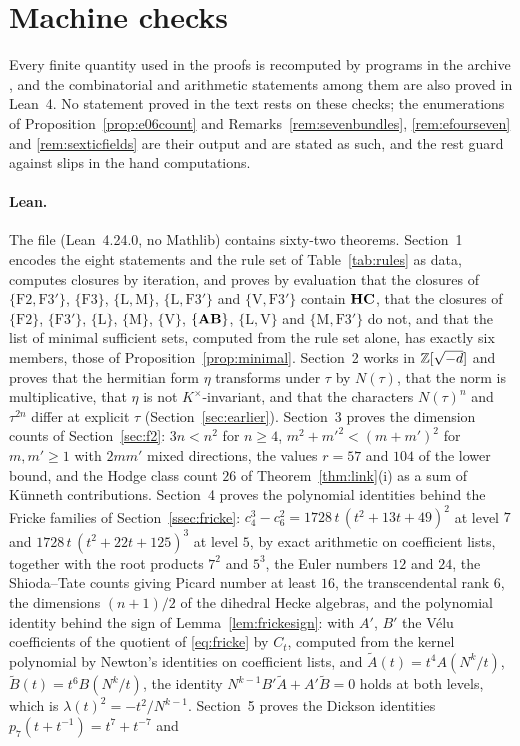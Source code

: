 \section{Machine checks}\label{app:checks}

Every finite quantity used in the proofs is recomputed by programs in the archive \cite{BB26code}, and the combinatorial and arithmetic statements among them are also proved in Lean~4. No statement proved in the text rests on these checks; the enumerations of Proposition~\ref{prop:e06count} and Remarks~\ref{rem:sevenbundles}, \ref{rem:efourseven} and \ref{rem:sexticfields} are their output and are stated as such, and the rest guard against slips in the hand computations.

\paragraph{Lean.} The file  (Lean~4.24.0, no Mathlib) contains sixty-two theorems. Section~1 encodes the eight statements and the rule set of Table~\ref{tab:rules} as data, computes closures by iteration, and proves by evaluation that the closures of $\{\mathrm{F2},\mathrm{F3}'\}$, $\{\mathrm{F3}\}$, $\{\mathrm{L},\mathrm{M}\}$, $\{\mathrm{L},\mathrm{F3}'\}$ and $\{\mathrm{V},\mathrm{F3}'\}$ contain $\mathbf{HC}$, that the closures of $\{\mathrm{F2}\}$, $\{\mathrm{F3}'\}$, $\{\mathrm{L}\}$, $\{\mathrm{M}\}$, $\{\mathrm{V}\}$, $\{\mathbf{AB}\}$, $\{\mathrm{L},\mathrm{V}\}$ and $\{\mathrm{M},\mathrm{F3}'\}$ do not, and that the list of minimal sufficient sets, computed from the rule set alone, has exactly six members, those of Proposition~\ref{prop:minimal}. Section~2 works in $\mathbb{Z}[\sqrt{-d}]$ and proves that the hermitian form $\eta$ transforms under $\tau$ by $N(\tau)$, that the norm is multiplicative, that $\eta$ is not $K^{\times}$-invariant, and that the characters $N(\tau)^{n}$ and $\tau^{2n}$ differ at explicit $\tau$ (Section~\ref{sec:earlier}). Section~3 proves the dimension counts of Section~\ref{sec:f2}: $3n<n^{2}$ for $n\ge4$, $m^{2}+m'^{2}<(m+m')^{2}$ for $m,m'\ge1$ with $2mm'$ mixed directions, the values $r=57$ and $104$ of the lower bound, and the Hodge class count $26$ of Theorem~\ref{thm:link}(i) as a sum of K\"unneth contributions. Section~4 proves the polynomial identities behind the Fricke families of Section~\ref{ssec:fricke}: $c_{4}^{3}-c_{6}^{2}=1728\,t\,(t^{2}+13t+49)^{2}$ at level $7$ and $1728\,t\,(t^{2}+22t+125)^{3}$ at level $5$, by exact arithmetic on coefficient lists, together with the root products $7^{2}$ and $5^{3}$, the Euler numbers $12$ and $24$, the Shioda--Tate counts giving Picard number at least $16$, the transcendental rank $6$, the dimensions $(n+1)/2$ of the dihedral Hecke algebras, and the polynomial identity behind the sign of Lemma~\ref{lem:frickesign}: with $A'$, $B'$ the V\'elu coefficients of the quotient of \eqref{eq:fricke} by $C_{t}$, computed from the kernel polynomial by Newton's identities on coefficient lists, and $\tilde A(t)=t^{4}A(N^{k}/t)$, $\tilde B(t)=t^{6}B(N^{k}/t)$, the identity $N^{k-1}B'\tilde A+A'\tilde B=0$ holds at both levels, which is $\lambda(t)^{2}=-t^{2}/N^{k-1}$. Section~5 proves the Dickson identities $p_{7}(t+t^{-1})=t^{7}+t^{-7}$ and 
